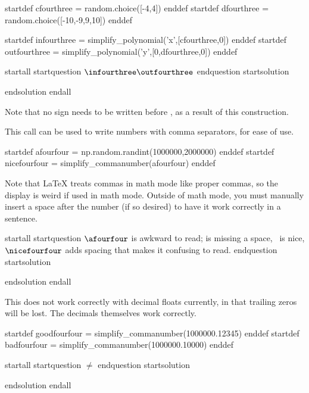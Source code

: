 startdef cfourthree = random.choice([-4,4]) enddef
startdef dfourthree = random.choice([-10,-9,9,10]) enddef

startdef infourthree = simplify_polynomial('x',[cfourthree,0]) enddef
startdef outfourthree = simplify_polynomial('y',[0,dfourthree,0]) enddef

startall
startquestion  $\infourthree \outfourthree$ endquestion
startsolution \item  endsolution
endall

Note that no sign needs to be written before \outfourthree, as a result of this construction.




This call can be used to write numbers with comma separators, for ease of use.

startdef afourfour = np.random.randint(1000000,2000000) enddef
startdef nicefourfour = simplify_commanumber(afourfour) enddef

Note that LaTeX treats commas in math mode like proper commas, so the display is weird if used in math mode. Outside of math mode, you must manually insert a space after the number (if so desired) to have it work correctly in a sentence. 

startall
startquestion $\afourfour$ is awkward to read; \nicefourfour is missing a space, \nicefourfour\ is nice, $\nicefourfour$ adds spacing that makes it confusing to read. endquestion
startsolution \item  endsolution
endall

This does not work correctly with decimal floats currently, in that trailing zeros will be lost. The decimals themselves work correctly.

startdef goodfourfour = simplify_commanumber(1000000.12345) enddef
startdef badfourfour = simplify_commanumber(1000000.10000) enddef

startall
startquestion  \goodfourfour $\neq$ \badfourfour endquestion
startsolution \item  endsolution
endall
